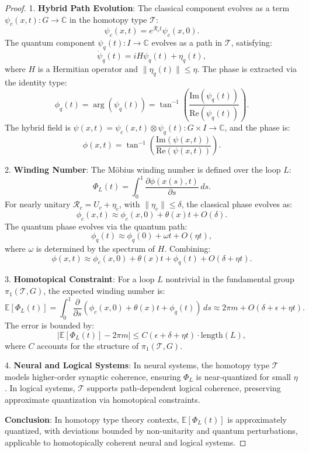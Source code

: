 \documentclass[12pt]{article}
\begin{document}
\begin{proof}

1. \textbf{Hybrid Path Evolution}:
   The classical component evolves as a term \(\psi_c(x,t): G \to \mathbb{C}\) in the homotopy type \(\mathcal{T}\):
   \[
   \psi_c(x,t) = e^{\mathcal{R}_c t} \psi_c(x,0).
   \]
   The quantum component \(\psi_q(t): I \to \mathbb{C}\) evolves as a path in \(\mathcal{T}\), satisfying:
   \[
   \dot{\psi}_q(t) = i H \psi_q(t) + \eta_q(t),
   \]
   where \(H\) is a Hermitian operator and \(\|\eta_q(t)\| \leq \eta\). The phase is extracted via the identity type:
   \[
   \phi_q(t) = \arg(\psi_q(t)) = \tan^{-1}\left( \frac{\text{Im}(\psi_q(t))}{\text{Re}(\psi_q(t))} \right).
   \]
   The hybrid field is \(\psi(x,t) = \psi_c(x,t) \otimes \psi_q(t): G \times I \to \mathbb{C}\), and the phase is:
   \[
   \phi(x,t) = \tan^{-1}\left( \frac{\text{Im}(\psi(x,t))}{\text{Re}(\psi(x,t))} \right).
   \]

2. \textbf{Winding Number}:
   The Möbius winding number is defined over the loop \(L\):
   \[
   \Phi_L(t) = \int_0^1 \frac{\partial \phi(x(s),t)}{\partial s} \, ds.
   \]
   For nearly unitary \(\mathcal{R}_c = U_c + \eta_c\), with \(\|\eta_c\| \leq \delta\), the classical phase evolves as:
   \[
   \phi_c(x,t) \approx \phi_c(x,0) + \theta(x)t + O(\delta).
   \]
   The quantum phase evolves via the quantum path:
   \[
   \phi_q(t) \approx \phi_q(0) + \omega t + O(\eta t),
   \]
   where \(\omega\) is determined by the spectrum of \(H\). Combining:
   \[
   \phi(x,t) \approx \phi_c(x,0) + \theta(x)t + \phi_q(t) + O(\delta + \eta t).
   \]

3. \textbf{Homotopical Constraint}:
   For a loop \(L\) nontrivial in the fundamental group \(\pi_1(\mathcal{T}, G)\), the expected winding number is:
   \[
   \mathbb{E}[\Phi_L(t)] = \int_0^1 \frac{\partial}{\partial s} \left( \phi_c(x,0) + \theta(x)t + \phi_q(t) \right) \, ds \approx 2\pi m + O(\delta + \epsilon + \eta t).
   \]
   The error is bounded by:
   \[
   \left| \mathbb{E}[\Phi_L(t)] - 2\pi m \right| \leq C (\epsilon + \delta + \eta t) \cdot \text{length}(L),
   \]
   where \(C\) accounts for the structure of \(\pi_1(\mathcal{T}, G)\).

4. \textbf{Neural and Logical Systems}:
   In neural systems, the homotopy type \(\mathcal{T}\) models higher-order synaptic coherence, ensuring \(\Phi_L\) is near-quantized for small \(\eta\). In logical systems, \(\mathcal{T}\) supports path-dependent logical coherence, preserving approximate quantization via homotopical constraints.

\textbf{Conclusion}: In homotopy type theory contexts, \(\mathbb{E}[\Phi_L(t)]\) is approximately quantized, with deviations bounded by non-unitarity and quantum perturbations, applicable to homotopically coherent neural and logical systems.

\end{proof}
\end{document}
